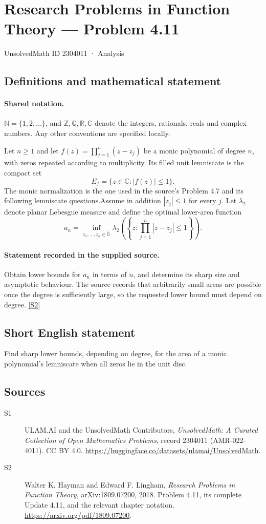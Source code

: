 \documentclass[11pt]{book}
\newcommand{\sref}[2]{\hyperlink{source:#1:#2}{[S#2]}}
\begin{document}
\setcounter{section}{2304010}
\section{Research Problems in Function Theory — Problem 4.11}\label{2304011}
{\small\sffamily UnsolvedMath ID 2304011 · Analysis}
\subsection{Definitions and mathematical statement}

\paragraph{Shared notation.}$\mathbb N=\{1,2,\ldots\}$, and $\mathbb Z,\mathbb Q,\mathbb R,\mathbb C$ denote the integers, rationals, reals and complex numbers. Any other conventions are specified locally.


Let $n\ge1$ and let $f(z)=\prod_{j=1}^n(z-z_j)$ be a monic polynomial of degree $n$, with zeros repeated according to multiplicity. Its filled unit lemniscate is the compact set
\[E_f=\{z\in\mathbb C:|f(z)|\le1\}.
\]
The monic normalization is the one used in the source's Problem 4.7 and its following lemniscate questions.Assume in addition $|z_j|\le1$ for every $j$. Let $\lambda_2$ denote planar Lebesgue measure and define the optimal lower-area function
\[a_n=\inf_{z_1,\ldots,z_n\in\overline{\mathbb D}}\lambda_2\left(\left\{z:\prod_{j=1}^n|z-z_j|\le1\right\}\right).
\]
\paragraph{Statement recorded in the supplied source.}
Obtain lower bounds for $a_n$ in terms of $n$, and determine its sharp size and asymptotic behaviour. The source records that arbitrarily small areas are possible once the degree is sufficiently large, so the requested lower bound must depend on degree. \sref{2304011}{2}
\subsection{Short English statement}
Find sharp lower bounds, depending on degree, for the area of a monic polynomial’s lemniscate when all zeros lie in the unit disc.
\subsection{Sources}
\begin{description}
\item[\hypertarget{source:2304011:1}{S1}] ULAM.AI and the UnsolvedMath Contributors, \emph{UnsolvedMath: A Curated Collection of Open Mathematics Problems}, record 2304011 (AMR-022-4011). CC BY 4.0. \url{https://huggingface.co/datasets/ulamai/UnsolvedMath}.
\item[\hypertarget{source:2304011:2}{S2}] Walter K. Hayman and Edward F. Lingham, \emph{Research Problems in Function Theory}, arXiv:1809.07200, 2018. Problem 4.11, its complete Update 4.11, and the relevant chapter notation. \url{https://arxiv.org/pdf/1809.07200}.
\end{description}
\label{end:2304011}
\end{document}
